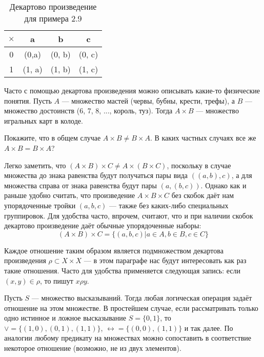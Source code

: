 \begin{table}[h]
\centering
\begin{tabular}{c|ccc}
$\times$ & a&b&c\\
\hline
0 & (0,a) & (0, b) & (0, c) \\
1 & (1, a)& (1, b) &(1, c)
\end{tabular}
\caption{Декартово произведение для примера 2.9}
\end{table}

\begin{example}
Часто с помощью декартова произведения можно описывать какие-то физические понятия. Пусть $A$ — множество мастей (червы, бубны, крести, трефы), а $B$ — множество достоинств (6, 7, 8, ..., король, туз). Тогда $A \times B$ — множество игральных карт в колоде.
\end{example}

\begin{exercise}
Покажите, что в общем случае $A\times B \not = B \times A$. В каких частных случаях все же $A\times B = B \times A$?
\end{exercise}

Легко заметить, что $(A\times B)\times C \not= A\times (B \times C)$, поскольку в случае множества до знака равенства будут получаться пары вида $((a, b), c)$, а для множества справа от знака равенства будут пары $(a, (b, c))$. Однако как и раньше удобно считать, что произведение $A\times B\times C$ без скобок даёт нам упорядоченные тройки $(a, b, c)$ — также без каких-либо специальных группировок. Для удобства часто, впрочем, считают, что и при наличии скобок декартово произведение даёт обычные упорядоченные наборы: 
$$(A\times B)\times C = \{(a, b, c)|a\in A, b\in B, c\in C\}$$

Каждое отношение таким образом является подмножеством декартова произведения $\rho \subset X\times X$ — в этом параграфе нас будут интересовать как раз такие отношения. Часто для удобства применяется следующая запись: если $(x, y) \in \rho$, то пишут $x\rho y$.

\begin{example}
Пусть $S$ — множество высказываний. Тогда любая логическая операция задаёт отношение на этом множестве. В простейшем случае, если рассматривать только одно истинное и ложное высказывание $S = \{0, 1\}$, то $\vee = \{(1, 0), (0, 1), (1, 1)\}$, $\leftrightarrow = \{(0, 0), (1, 1)\}$ и так далее. По аналогии любому предикату на множествах можно сопоставить в соответствие некоторое отношение (возможно, не из двух элементов).
\end{example}

